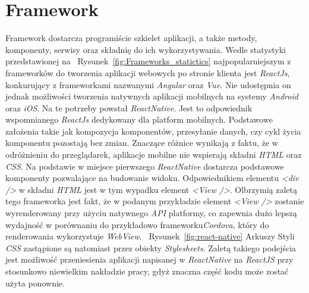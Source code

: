 \documentclass[skorowidz,skroty]{dyplomWEZUT}
\begin{document}
\section{Framework}\label{sec: framework}

Framework dostarcza programiście szkielet aplikacji, a także metody, komponenty, serwisy oraz składnię do ich wykorzystywania. Wedle statystyki przedstawionej na ~Rysunek~\ref{fig:Frameworks_statictics} \cite{FrameworksPopularity} najpopularniejszym z frameworków do tworzenia aplikacji webowych po stronie klienta jest \textit{ReactJs}, konkurujący z frameworkami nazwanymi \textit{Angular} oraz \textit{Vue}. Nie udostępnia on jednak możliwości tworzenia natywnych aplikacji mobilnych na systemy \textit{Android} oraz \textit{iOS}. Na te potrzeby powstał \textit{ReactNative}. Jest to odpowiednik wspomnianego \textit{ReactJs} dedykowany dla platform mobilnych. Podstawowe założenia takie jak kompozycja komponentów, przesyłanie danych, czy cykl życia komponentu pozostają bez zmian. Znaczące różnice wynikają z faktu, że w odróżnieniu do przeglądarek, aplikacje mobilne nie wspierają składni \textit{HTML} oraz \textit{CSS}. Na podstawie \cite{ReactNative} w miejsce pierwszego \textit{ReactNative} dostarcza podstawowe komponenty pozwalające na budowanie widoku. Odpowiednikiem elementu \textit{<div />} w składni \textit{HTML} jest w tym wypadku element \textit{<View />}. Olbrzymią zaletą tego frameworka jest fakt, że w podanym przykładzie element \textit{<View />} zostanie wyrenderowany przy użyciu natywnego \textit{API} platformy, co zapewnia dużo lepszą wydajność w porównaniu do przykładowo frameworku\textit{Cordova}, który do renderowania wykorzystuje \textit{WebView}. ~Rysunek~\ref{fig:react-native} Arkuszy Styli \textit{CSS} zastąpione są natomiast przez obiekty \textit{Stylesheets}. Zaletą takiego podejścia jest możliwość przeniesienia aplikacji napisanej w \textit{ReactNative} na \textit{ReactJS} przy stosunkowo niewielkim nakładzie pracy, gdyż znaczna część kodu może zostać użyta ponownie. 
\end{document}
